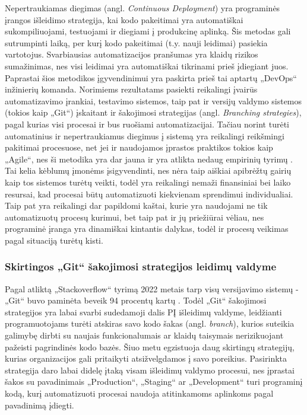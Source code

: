 \documentclass{VUMIFPSkursinis}
\begin{document}
Nepertraukiamas diegimas (angl. \textit{Continuous Deployment}) yra programinės įrangos išleidimo strategija, kai kodo pakeitimai yra automatiškai sukompiliuojami, testuojami ir diegiami į produkcinę aplinką. Šis metodas gali sutrumpinti laiką, per kurį kodo pakeitimai (t.y. nauji leidimai) pasiekia vartotojus. Svarbiausias automatizacijos pranšumas yra klaidų rizikos sumažinimas, nes visi leidimai yra automatiškai tikrinami prieš įdiegiant juos. Paprastai šios metodikos įgyvendinimui yra paskirta prieš tai aptartų „DevOps“ inžinierių komanda. Norimiems rezultatams pasiekti reikalingi įvairūs automatizavimo įrankiai, testavimo sistemos, taip pat ir versijų valdymo sistemos (tokios kaip „Git“) įskaitant ir šakojimosi strategijas (angl. \textit{Branching strategies}), pagal kurias visi procesai ir bus ruošiami automatizacijai. Tačiau norint turėti automatinius ir nepertraukiamus diegimus į sistemą yra reikalingi reikšmingi pakitimai procesuose, net jei ir naudojamos įprastos praktikos tokios kaip „Agile“, nes ši metodika yra dar jauna ir yra atlikta nedaug empirinių tyrimų \cite{SaltSeptintas}. Tai kelia kėblumų įmonėms įsigyvendinti, nes nėra taip aiškiai apibrėžtų gairių kaip tos sistemos turėtų veikti, todėl yra reikalingi nemaži finansiniai bei laiko resursai, kad procesai būtų automatizuoti kiekvienam sprendimui individualiai. Taip pat yra reikalingi dar papildomi kaštai, kurie yra naudojami ne tik automatizuotų procesų kurimui, bet taip pat ir jų priežiūrai vėliau, nes programinė įranga yra dinamiškai kintantis dalykas, todėl ir procesų veikimas pagal situaciją turėtų kisti.
    
    \subsubsection{Skirtingos „Git“ šakojimosi strategijos leidimų valdyme}

Pagal atliktą „Stackoverflow“ tyrimą 2022 metais tarp visų versijavimo sistemų - „Git“ buvo paminėta beveik 94 procentų kartų \cite{SaltAstuntas}. Todėl „Git“ šakojimosi strategijos yra labai svarbi sudedamoji dalis PĮ išleidimų valdyme, leidžianti programuotojams turėti atskiras savo kodo šakas (angl. \textit{branch}), kurios suteikia galimybę dirbti su naujais funkcionalumais ar klaidų taisymais nerizikuojant pažeisti pagrindinės kodo bazės. Šiuo metu egzistuoja daug skirtingų strategijų, kurias organizacijos gali pritaikyti atsižvelgdamos į savo poreikius. Pasirinkta strategija daro labai didelę įtaką visam išleidimų valdymo procesui, nes įprastai šakos su pavadinimais „Production“, „Staging“ ar „Development“ turi programinį kodą, kurį automatizuoti procesai naudoja atitinkamoms aplinkoms pagal pavadinimą įdiegti.
\end{document}
